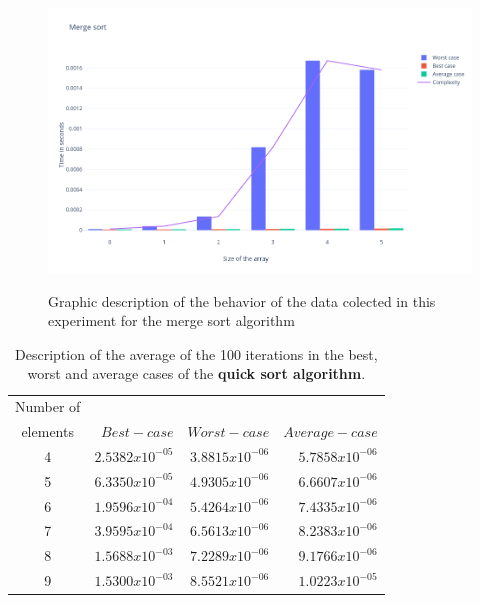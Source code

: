 \documentclass{article}
\begin{document}
\begin{figure}[htp]
	\centering
		\caption{Graphic description of the behavior of the data colected in this experiment for the merge sort algorithm}
	\includegraphics[width=\linewidth]{Mergesort.png}
	\label{ima5}
\end{figure}

     \begin{table}[h!]
\centering
 \caption{Description of the average of the 100 iterations in the best, worst and average cases of the \textbf{quick sort algorithm}. } 
 \label{ta8}
 \begin{tabular} {| c | r | r | r | }
 \hline

Number of 	&		&		&		\\
 elements	&		$	Best-case	$	&	$	Worst-case	$	&	$	Average -case	$	\\
 \hline

4	&	$	2.5382x10^{-05}	$	&	$	3.8815x10^{-06}	$	&	$	5.7858x10^{-06}	$	\\
 \hline
5	&	$	6.3350x10^{-05}	$	&	$	4.9305x10^{-06}	$	&	$	6.6607x10^{-06}	$	\\
 \hline
6	&	$	1.9596x10^{-04}	$	&	$	5.4264x10^{-06}	$	&	$	7.4335x10^{-06}	$	\\
 \hline
7	&	$	3.9595x10^{-04}	$	&	$	6.5613x10^{-06}	$	&	$	8.2383x10^{-06}	$	\\
 \hline
8	&	$	1.5688x10^{-03}	$	&	$	7.2289x10^{-06}	$	&	$	9.1766x10^{-06}	$	\\
 \hline
9	&	$	1.5300x10^{-03}	$	&	$	8.5521x10^{-06}	$	&	$	1.0223x10^{-05}	$	\\
\hline
 \end{tabular}
 \end{table}
 
\end{document}
